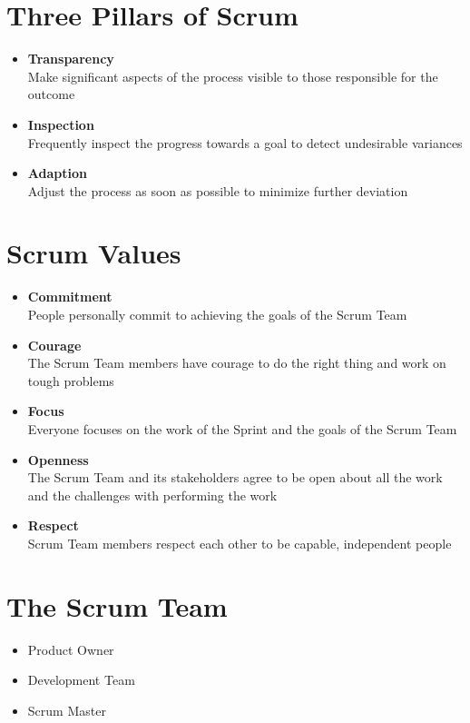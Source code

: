 \documentclass[a4paper,11pt,twocolumn]{article}
\begin{document}
\section*{Three Pillars of Scrum}
\begin{itemize}
	\item \textbf{Transparency}\\
	Make significant aspects of the process visible to those responsible for the outcome
	\item \textbf{Inspection}\\
		Frequently inspect the progress towards a goal to detect undesirable variances
	\item \textbf{Adaption}\\
	Adjust the process as soon as possible to minimize further deviation
\end{itemize}

\section*{Scrum Values}
\begin{itemize}
    \item \textbf{Commitment}\\
    People personally commit to achieving the goals of the Scrum Team
    \item \textbf{Courage}\\
    The Scrum Team members have courage to do the right thing and work on tough problems
    \item \textbf{Focus}\\
    Everyone focuses on the work of the Sprint and the goals of the Scrum Team
    \item \textbf{Openness}\\
    The Scrum Team and its stakeholders agree to be open about all the work and the challenges with performing the work
    \item \textbf{Respect}\\
    Scrum Team members respect each other to be capable, independent people
\end{itemize}

\section*{The Scrum Team}
\begin{itemize}
    \item Product Owner
    \item Development Team
    \item Scrum Master
\end{itemize}
\end{document}
